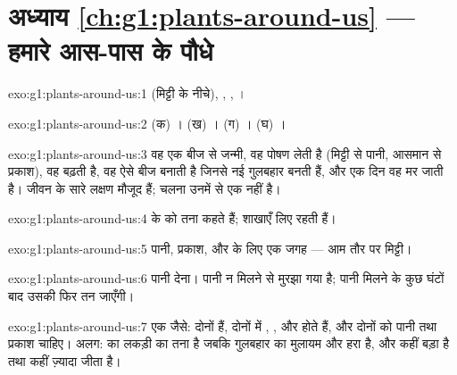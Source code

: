 \section*{अध्याय \ref{ch:g1:plants-around-us} --- हमारे आस-पास के पौधे}

\begin{solution}{exo:g1:plants-around-us:1}
 (मिट्टी के नीचे), , , ।
\end{solution}

\begin{solution}{exo:g1:plants-around-us:2}
(क) । (ख) । (ग) । (घ) ।
\end{solution}

\begin{solution}{exo:g1:plants-around-us:3}
वह एक बीज से जन्मी, वह पोषण लेती है (मिट्टी से पानी, आसमान से
प्रकाश), वह बढ़ती है, वह ऐसे बीज बनाती है जिनसे नई गुलबहार बनती हैं,
और एक दिन वह मर जाती है। जीवन के सारे लक्षण मौजूद हैं; चलना उनमें से
एक नहीं है।
\end{solution}

\begin{solution}{exo:g1:plants-around-us:4}
 के  को तना कहते हैं;  शाखाएँ लिए रहती हैं।
\end{solution}

\begin{solution}{exo:g1:plants-around-us:5}
पानी, प्रकाश, और  के लिए एक जगह --- आम तौर पर मिट्टी।
\end{solution}

\begin{solution}{exo:g1:plants-around-us:6}
पानी देना। पानी न मिलने से  मुरझा गया है; पानी मिलने के कुछ घंटों
बाद उसकी  फिर तन जाएँगी।
\end{solution}

\begin{solution}{exo:g1:plants-around-us:7}
एक जैसे: दोनों  हैं, दोनों में , ,  और  होते
हैं, और दोनों को पानी तथा प्रकाश चाहिए। अलग:  का  लकड़ी का
तना है जबकि गुलबहार का  मुलायम और हरा है, और  कहीं बड़ा है
तथा कहीं ज़्यादा जीता है।
\end{solution}


